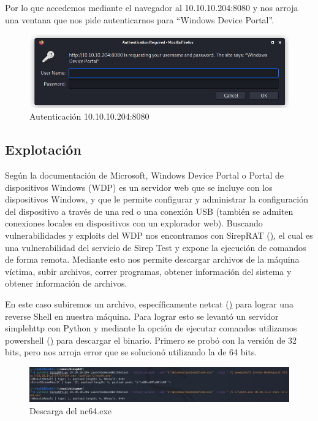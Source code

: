 \documentclass{article}
\begin{document}
Por lo que accedemos mediante el navegador al 10.10.10.204:8080 y nos arroja una ventana que nos pide autenticarnos para “Windows Device Portal”.
\begin{figure}[H]
	\center
	\includegraphics[width=\textwidth]{images/omni/3.png}
	\caption{Autenticación 10.10.10.204:8080}
\end{figure}

\subsection{Explotación}

Según la documentación de Microsoft, Windows Device Portal o Portal de dispositivos Windows (WDP) es un servidor web que se incluye con los dispositivos Windows, y que le permite configurar y administrar la configuración del dispositivo a través de una red o una conexión USB (también se admiten conexiones locales en dispositivos con un explorador web).
Buscando vulnerabilidades y exploits del WDP nos encontramos con SirepRAT (\href{https://github.com/SafeBreach-Labs/SirepRAT}), el cual es una vulnerabilidad del servicio de Sirep Test y expone la ejecución de comandos de forma remota. Mediante esto nos permite descargar archivos de la máquina víctima, subir archivos, correr programas, obtener información del sistema y obtener información de archivos.

En este caso subiremos un archivo, específicamente netcat (\href{https://github.com/int0x33/nc.exe/}) para lograr una reverse Shell en nuestra máquina.
Para lograr esto se levantó un servidor simplehttp con Python y mediante la opción de ejecutar comandos utilizamos powershell (\href{https://academy.hackthebox.com/course/preview/file-transfers/windows-file-transfer-methods}) para descargar el binario.
Primero se probó con la versión de 32 bits, pero nos arroja error que se solucionó utilizando la de 64 bits.
\begin{figure}[H]
	\center
	\includegraphics[width=\textwidth]{images/omni/5.png}
	\caption{Descarga del nc64.exe}
\end{figure}
\end{document}
